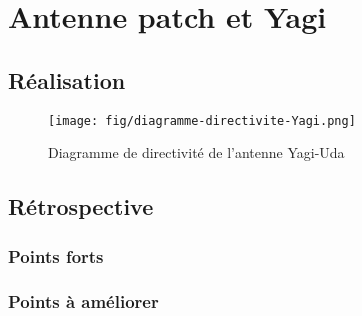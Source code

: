 \chapter{Antenne patch et Yagi}
\label{chap:antennes}

\section{Réalisation}


\begin{figure}[H]
	\center
	\texttt{[image: fig/diagramme-directivite-Yagi.png]}
	\caption{Diagramme de directivité de l'antenne Yagi-Uda}
	\label{f:diagramme_directivite_yagi}
\end{figure}

\section{Rétrospective}

\subsection{Points forts}



\subsection{Points à améliorer}
